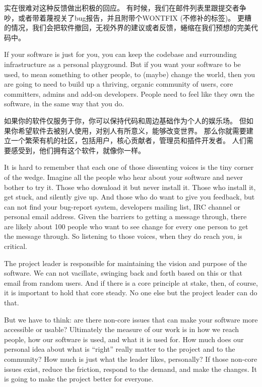 实在很难对这种反馈做出积极的回应。
有时候，我们在邮件列表里跟提交者争吵，或者带着蔑视关了bug报告，并且附带个WONTFIX
(不修补的标签)。
更糟的情况，我们会把软件撤回，无视外界的建议或者反馈，蜷缩在我们预想的完美代码中。

If your software is just for you, you can keep the codebase and surrounding
infrastructure as a personal playground. But if you want your software to be
used, to mean something to other people, to (maybe) change the world, then
you are going to need to build up a thriving, organic community of users, core
committers, admins and add-on developers. People need to feel like they own the
software, in the same way that you do.

如果你的软件仅服务于你，你可以保持代码和周边基础作为个人的娱乐场。
但如果你希望软件去被别人使用，对别人有所意义，能够改变世界。
那么你就需要建立一个繁荣有机的社区，包括用户，核心贡献者，管理员和插件开发者。
人们需要感受到，他们拥有这个软件，就像你一样。

It is hard to remember that each one of those dissenting voices is the tiny
corner of the wedge. Imagine all the people who hear about your software and
never bother to try it. Those who download it but never install it. Those who
install it, get stuck, and silently give up. And those who do want to give you
feedback, but can not find your bug-report system, developers mailing list, IRC
channel or personal email address. Given the barriers to getting a message
through, there are likely about 100 people who want to see change for
every one person to get the message through. So listening to those voices, when
they do reach you, is critical.

The project leader is responsible for maintaining the vision and purpose of the
software. We can not vacillate, swinging back and forth based on this or that
email from random users. And if there is a core principle at stake, then, of
course, it is important to hold that core steady. No one else but the project
leader can do that.

But we have to think: are there non-core issues that can make your software more
accessible or usable? Ultimately the measure of our work is in how we reach people, how our software is used, and what it is used for. How much does our personal idea about what is ``right'' really matter to the project and to the community? How much is just what the leader likes, personally? If those non-core issues exist, reduce the friction, respond to the demand, and make the changes. It is going to make the project better for everyone.
